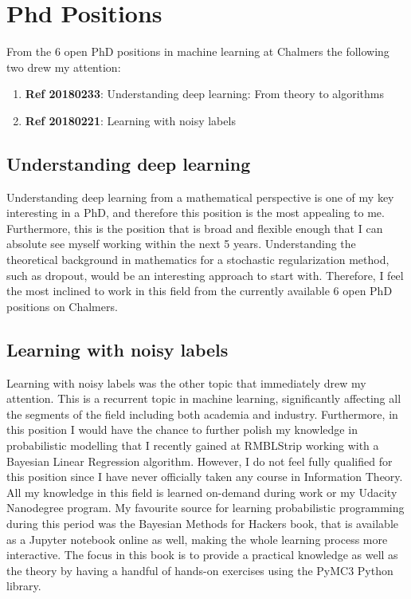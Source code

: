 \documentclass[12pt]{article}
\begin{document}
\section*{Phd Positions}
From the 6 open PhD positions in machine learning at Chalmers the following two drew my attention:
\begin{enumerate}
    \item \textbf{Ref 20180233}: Understanding deep learning: From theory to algorithms
    \item \textbf{Ref 20180221}: Learning with noisy labels
\end{enumerate}

\subsection*{Understanding deep learning}
Understanding deep learning from a mathematical perspective is one of my key interesting in a PhD, and therefore this position is the most appealing to me. Furthermore, this is the position that is broad and flexible enough that I can absolute see myself working within the next 5 years. Understanding the theoretical background in mathematics for a stochastic regularization method, such as dropout, would be an interesting approach to start with. Therefore, I feel the most inclined to work in this field from the currently available 6 open PhD positions on Chalmers.

\subsection*{Learning with noisy labels}
Learning with noisy labels was the other topic that immediately drew my attention. This is a recurrent topic in machine learning, significantly affecting all the segments of the field including both academia and industry. Furthermore, in this position I would have the chance to further polish my knowledge in probabilistic modelling that I recently gained at RMBLStrip working with a Bayesian Linear Regression algorithm. However, I do not feel fully qualified for this position since I have never officially taken any course in Information Theory. All my knowledge in this field is learned on-demand during work or my Udacity Nanodegree program. My favourite source for learning probabilistic programming during this period was the Bayesian Methods for Hackers book\cite{probabilistic_programming}, that is available as a Jupyter notebook online as well, making the whole learning process more interactive. The focus in this book is to provide a practical knowledge as well as the theory by having a handful of hands-on exercises using the PyMC3 Python library.
\end{document}
